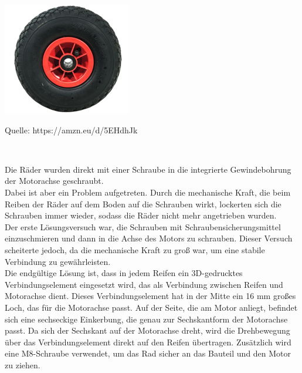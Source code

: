 \documentclass[ngerman,12pt,a4paper]{article}
\begin{document}
	\begin{center} 
		\begin{minipage}[t]{0.39\textwidth}
			\includegraphics{Pictures/Rad}
			\label{fig: Rad}
			\vspace{-10pt}
			\begin{center}
				\par\small Quelle: https://amzn.eu/d/5EHdhJk
			\end{center}
		\end{minipage} \\[0.75cm]
	\end{center}
	Die Räder wurden direkt mit einer Schraube in die integrierte Gewindebohrung der Motorachse geschraubt. \\[0.5cm]
	Dabei ist aber ein Problem aufgetreten. Durch die mechanische Kraft, die beim Reiben der Räder auf dem Boden auf die Schrauben wirkt, lockerten sich die Schrauben immer wieder, sodass die Räder nicht mehr angetrieben wurden.\\[0.5cm]
	Der erste Lösungsversuch war, die Schrauben mit Schraubensicherungsmittel einzuschmieren und dann in die Achse des Motors zu schrauben. Dieser Versuch scheiterte jedoch, da die mechanische Kraft zu groß war, um eine stabile Verbindung zu gewährleisten.\\[0.5cm]
	Die endgültige Lösung ist, dass in jedem Reifen ein 3D-gedrucktes Verbindungselement eingesetzt wird, das als Verbindung zwischen Reifen und Motorachse dient. Dieses Verbindungselement hat in der Mitte ein 16 mm großes Loch, das für die Motorachse passt. Auf der Seite, die am Motor anliegt, befindet sich eine sechseckige Einkerbung, die genau zur Sechskantform der Motorachse passt. Da sich der Sechskant auf der Motorachse dreht, wird die Drehbewegung über das Verbindungselement direkt auf den Reifen übertragen. Zusätzlich wird eine M8-Schraube verwendet, um das Rad sicher an das Bauteil und den Motor zu ziehen.  
\end{document}
